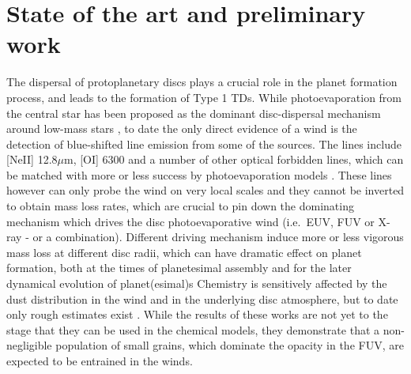 \documentclass[10pt,fleqn,twoside]{article}
\begin{document}
\section{State of the art and preliminary work}
\renewcommand{\leftmark}{\sc State of the Art and preliminary work}

The dispersal of protoplanetary discs plays a crucial role in the
planet formation process, and leads to the formation of Type
1 TDs. While photoevaporation from the central star has been proposed
as the dominant disc-dispersal mechanism around low-mass stars
\citep[e.g.,][]{2001MNRAS.328..485C}, to date the only direct evidence of a
wind is the detection of blue-shifted line emission from some of the
sources. The lines include [NeII] 12.8$\mu$m, [OI] 6300 and a number
of other optical forbidden lines, which can be matched with more or
less success by photoevaporation models \citep[e.g.,][]{1995ApJ...452..736H,
2008MNRAS.391L..64A, 2013ApJ...772...60R, 2014A&A...569A...5N, 
2009ApJ...702..724P, 2010MNRAS.401.1636S, 2010MNRAS.406.1553E,
2016MNRAS.460.3472E, 2016ApJ...831..169S}. These lines however
can only probe the wind on very local scales and they cannot be
inverted to obtain mass loss rates, which are crucial to pin down the
dominating mechanism which drives the disc photoevaporative wind
(i.e.\ EUV, FUV or X-ray - or a combination). Different driving
mechanism induce more or less vigorous mass loss at different disc
radii, which  can have dramatic effect on planet formation, both at
the times of planetesimal assembly and for the later dynamical
evolution of planet(esimal)s 
\citep[e.g.,][or the discussion in projects B1 and B2]{2012MNRAS.422L..82A, 2015MNRAS.450.3008E}
 Chemistry is
sensitively affected by the dust distribution in the wind and in the
underlying disc atmosphere, but to date only rough estimates exist
\citep[e.g.,][]{2011MNRAS.411.1104O, 2016MNRAS.463.2725H, 
2016MNRAS.461..742H}. While
the results of these works are not yet to the stage that they can 
be used in the chemical models, they demonstrate
that a non-negligible population of small grains, which dominate the
opacity in the FUV, are expected to be entrained in the winds. 
\end{document}
